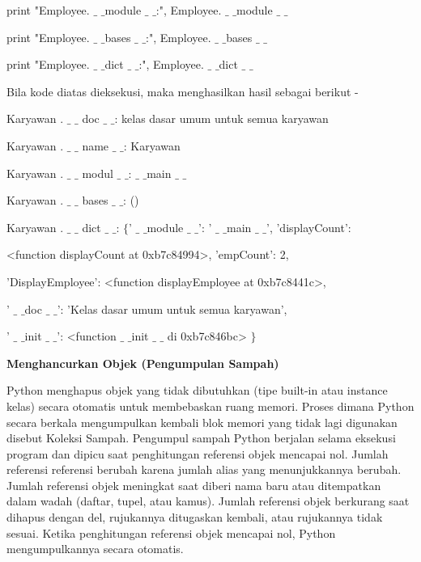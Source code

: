 \begin {enumerate}
print "Employee. $  \_  $ $  \_  $module $  \_  $ $  \_  $:", Employee. $  \_  $ $  \_  $module $  \_  $ $  \_  $ \par
\noindent 
print "Employee. $  \_  $ $  \_  $bases $  \_  $ $  \_  $:", Employee. $  \_  $ $  \_  $bases $  \_  $ $  \_  $ \par
\noindent 
print "Employee. $  \_  $ $  \_  $dict $  \_  $ $  \_  $:", Employee. $  \_  $ $  \_  $dict $  \_  $ $  \_  $ \par
\vspace{12pt}
\vspace{12pt}
\noindent 
Bila kode diatas dieksekusi, maka menghasilkan hasil sebagai berikut - \par
\vspace{12pt}
\noindent 
Karyawan . $  \_  $ $  \_  $ doc $  \_  $ $  \_  $: kelas dasar umum untuk semua karyawan \par
\noindent 
Karyawan . $  \_  $ $  \_  $ name $  \_  $ $  \_  $: Karyawan \par
\noindent 
Karyawan . $  \_  $ $  \_  $ modul $  \_  $ $  \_  $:  $  \_  $ $  \_  $main $  \_  $ $  \_  $ \par
\noindent 
Karyawan . $  \_  $ $  \_  $ bases $  \_  $ $  \_  $: () \par
\noindent 
Karyawan . $  \_  $ $  \_  $ dict $  \_  $ $  \_  $:  $  \{  $' $  \_  $ $  \_  $module $  \_  $ $  \_  $': ' $  \_  $ $  \_  $main $  \_  $ $  \_  $', 'displayCount': \par
\noindent 
<function displayCount at 0xb7c84994>, 'empCount': 2, \par
\noindent 
'DisplayEmployee': <function displayEmployee at 0xb7c8441c>, \par
\noindent 
' $  \_  $ $  \_  $doc $  \_  $ $  \_  $': 'Kelas dasar umum untuk semua karyawan', \par
\noindent 
' $  \_  $ $  \_  $init $  \_  $ $  \_  $': <function  $  \_  $ $  \_  $init $  \_  $ $  \_  $ di 0xb7c846bc> $  \}  $ \par
\vspace{12pt}
\noindent 
{\fontsize{14pt}{14pt}\selectfont \textbf{Menghancurkan Objek (Pengumpulan Sampah)} \\} \par
\vspace{12pt}
Python menghapus objek yang tidak dibutuhkan (tipe built-in atau instance kelas) secara otomatis untuk membebaskan ruang memori. Proses dimana Python secara berkala mengumpulkan kembali blok memori yang tidak lagi digunakan disebut Koleksi Sampah. Pengumpul sampah Python berjalan selama eksekusi program dan dipicu saat penghitungan referensi objek mencapai nol. Jumlah referensi referensi berubah karena jumlah alias yang menunjukkannya berubah. Jumlah referensi objek meningkat saat diberi nama baru atau ditempatkan dalam wadah (daftar, tupel, atau kamus). Jumlah referensi objek berkurang saat dihapus dengan del, rujukannya ditugaskan kembali, atau rujukannya tidak sesuai. Ketika penghitungan referensi objek mencapai nol, Python mengumpulkannya secara otomatis. \par

\end{enumerate}
